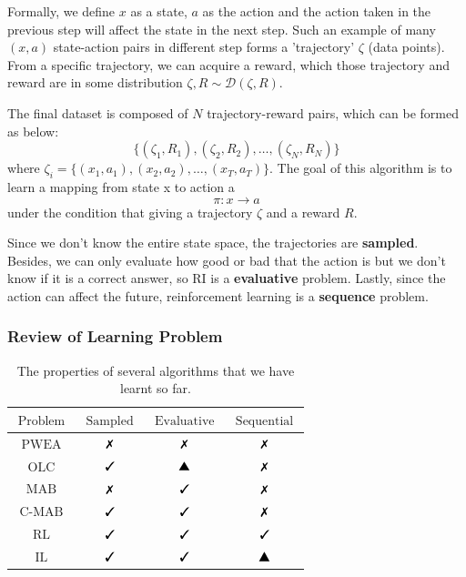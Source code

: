 \documentclass[11pt]{article}
\newcommand{\xmark}{\text{\ding{55}}}
\newcommand{\cmark}{\text{\ding{51}}}
\newcommand{\tri}{\text{\ding{115}}}
\begin{document}
Formally, we define $x$ as a state, $a$ as the action and the action taken in the previous step will affect the state in the next step. Such an example of many $(x, a)$ state-action pairs in different step forms a 'trajectory' $\zeta$ (data points). From a specific trajectory, we can acquire a reward, which those trajectory and reward are in some distribution $\zeta, R \sim \mathcal{D}(\zeta, R)$.

The final dataset is composed of $N$ trajectory-reward pairs, which can be formed as below:
$$\{ (\zeta_1, R_1), (\zeta_2, R_2), \dots, (\zeta_N, R_N) \}$$
where $\zeta_i = \{ (x_1, a_1), (x_2, a_2), \dots, (x_T, a_T) \}$.
%
The goal of this algorithm is to learn a mapping from state x to action a 
$$\pi : x \rightarrow a$$
under the condition that giving a trajectory $\zeta$ and a reward $R$.

Since we don't know the entire state space, the trajectories are \textbf{sampled}. Besides, we can only evaluate how good or bad that the action is but we don't know if it is a correct answer, so RI is a \textbf{evaluative} problem. Lastly, since the action can affect the future, reinforcement learning is a \textbf{sequence} problem.


\subsubsection{Review of Learning Problem}

\begin{table}[h!]
    \centering
    \begin{tabular}{|c|c|c|c|}
        \hline $\text { Problem }$ &  $\text { Sampled }$ & $\text { Evaluative }$ & $\text { Sequential }$ \\
        \hline $\text { PWEA }$ &     $\xmark$ & $\xmark$ & $\xmark$ \\
        \hline $\text { OLC }$ &      $\cmark$ & $\tri$ & $\xmark$ \\
        \hline $\text { MAB }$ &      $\xmark$ &        $\cmark$ & $\xmark$ \\
        \hline $\text { C-MAB }$ &    $\cmark$ & $\cmark$ & $\xmark$ \\
        \hline $\text { RL }$ &      $\cmark$ & $\cmark$ & $\cmark$ \\
        \hline $\text { IL }$ &      $\cmark$ & $\cmark$ & $\tri$ \\
        \hline
    \end{tabular}
    \caption{The properties of several algorithms that we have learnt so far.}
    \label{tab:my_label}
\end{table}
\end{document}
